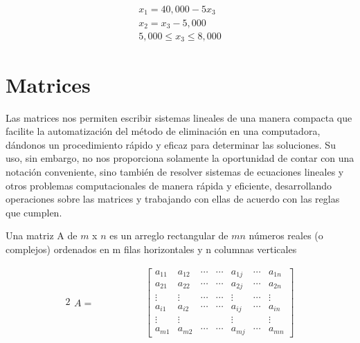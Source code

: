 \documentclass{article}
\begin{document}
\begin{equation*}
    \begin{aligned}
        x_1 = 40,000 -5x_3\\
        x_2 = x_3 - 5,000\\
        5,000 \leq x_3 \leq 8,000
    \end{aligned}
\end{equation*}

\section{Matrices}

Las matrices nos permiten escribir sistemas lineales de una manera compacta que facilite la automatización del método de eliminación en una computadora, dándonos un procedimiento rápido y eficaz para determinar las soluciones. Su uso, sin embargo, no nos proporciona solamente la oportunidad de contar con una notación conveniente, sino también de resolver sistemas de ecuaciones lineales y otros problemas computacionales de manera rápida y eficiente, desarrollando operaciones sobre las matrices y trabajando con ellas de acuerdo con las reglas que cumplen.

\begin{tcolorbox}[colback=blue!10!white,colframe=blue!60!black,title=Definición]
    Una matriz A de $m$ x $n$ es un arreglo rectangular de $mn$ números reales (o complejos) ordenados en m filas horizontales y n columnas verticales
\end{tcolorbox}

\begin{alignat*}{2}
    \begin{split}
        A = 
    \end{split} 
& \hspace{ 4em}%
    \begin{bmatrix}
        a_{11} & a_{12} & \dotsb & \dotsb & a_{1j} & \dotsb & a_{1n}\\
        a_{21} & a_{22} & \dotsb & \dotsb & a_{2j} & \dotsb & a_{2n}\\
        \vdots & \vdots & \dotsb & \dotsb & \vdots & \dotsb & \vdots\\
        a_{i1} & a_{i2} & \dotsb & \dotsb & a_{ij} & \dotsb & a_{in}\\
        \vdots & \vdots &  &  & \vdots &  & \vdots\\
        a_{m1} & a_{m2} & \dotsb & \dotsb & a_{mj} & \dotsb & a_{mn}
    \end{bmatrix} 
\end{alignat*}
\end{document}
